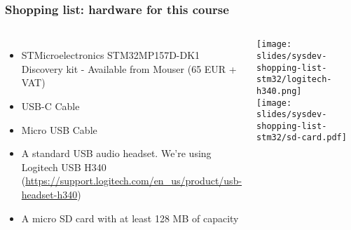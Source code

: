 \begin{frame}
\frametitle{Shopping list: hardware for this course}
  \begin{columns}
    \footnotesize
    \begin{itemize}
      \item STMicroelectronics STM32MP157D-DK1 Discovery kit -
        Available from Mouser (65 EUR + VAT)
      \item USB-C Cable
      \item Micro USB Cable
      \item A standard USB audio headset. We're using Logitech USB H340
	    (\url{https://support.logitech.com/en_us/product/usb-headset-h340})
      \item A micro SD card with at least 128 MB of capacity
    \end{itemize}
    \texttt{[image: slides/sysdev-shopping-list-stm32/logitech-h340.png]} \\
    \vspace{1cm}
    \texttt{[image: slides/sysdev-shopping-list-stm32/sd-card.pdf]}
  \end{columns}
\end{frame}
